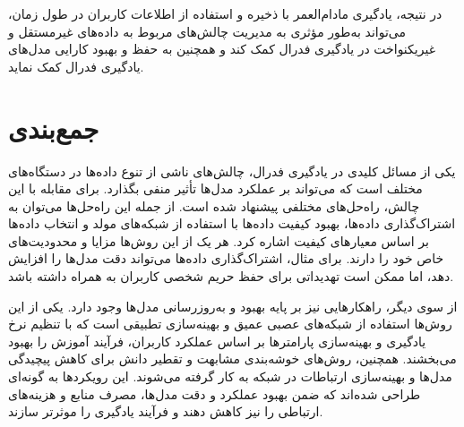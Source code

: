 در نتیجه، یادگیری مادام‌العمر با ذخیره و استفاده از اطلاعات کاربران در طول زمان، می‌تواند به‌طور مؤثری به مدیریت چالش‌های مربوط به داده‌های غیرمستقل و غیریکنواخت در یادگیری فدرال کمک کند و همچنین به حفظ و بهبود کارایی مدل‌های یادگیری فدرال کمک نماید.


\section{جمع‌بندی}
یکی از مسائل کلیدی در یادگیری فدرال، چالش‌های ناشی از تنوع داده‌ها در دستگاه‌های مختلف است که می‌تواند بر عملکرد مدل‌ها تأثیر منفی بگذارد. برای مقابله با این چالش، راه‌حل‌های مختلفی پیشنهاد شده است. از جمله این راه‌حل‌ها می‌توان به اشتراک‌گذاری داده‌ها، بهبود کیفیت داده‌ها با استفاده از شبکه‌های مولد و انتخاب داده‌ها بر اساس معیارهای کیفیت اشاره کرد. هر یک از این روش‌ها مزایا و محدودیت‌های خاص خود را دارند. برای مثال، اشتراک‌گذاری داده‌ها می‌تواند دقت مدل‌ها را افزایش دهد، اما ممکن است تهدیداتی برای حفظ حریم شخصی کاربران به همراه داشته باشد.

از سوی دیگر، راهکارهایی نیز بر پایه بهبود و به‌روزرسانی مدل‌ها وجود دارد. یکی از این روش‌ها استفاده از شبکه‌های عصبی عمیق و بهینه‌سازی تطبیقی است که با تنظیم نرخ یادگیری و بهینه‌سازی پارامترها بر اساس عملکرد کاربران، فرآیند آموزش را بهبود می‌بخشند. همچنین، روش‌های خوشه‌بندی مشابهت و تقطیر دانش برای کاهش پیچیدگی مدل‌ها و بهینه‌سازی ارتباطات در شبکه به کار گرفته می‌شوند. این رویکردها به گونه‌ای طراحی شده‌اند که ضمن بهبود عملکرد و دقت مدل‌ها، مصرف منابع و هزینه‌های ارتباطی را نیز کاهش دهند و فرآیند یادگیری را موثرتر سازند.
